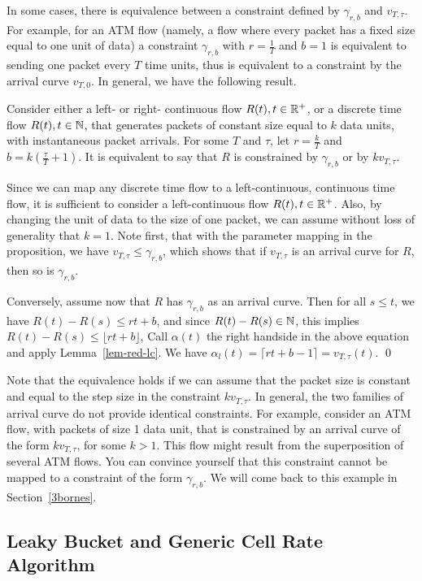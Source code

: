 In some cases, there is equivalence between a constraint defined
by $\gamma_{r,b}$ and $v_{T, \tau}$. For example, for an ATM flow
(namely, a flow where every packet has a fixed size equal to one
unit of data) a constraint $\gamma_{r,b}$ with $r=\frac{1}{T}$ and
$b=1$ is equivalent to sending one packet every $T$ time units,
thus is equivalent to a constraint by the arrival curve $v_{T,
0}$. In general, we have the following result.
\begin{proposition}
Consider either a left- or right- continuous flow $R(t), t \in
\mathbb{R}^+$, or a discrete time flow $R(t), t \in \mathbb{N}$, that
generates packets of constant size equal to $k$ data units, with
instantaneous packet arrivals. For some $T$ and $\tau$, let
$r=\frac{k}{T}$ and $b=k(\frac{\tau}{T}+1)$. It is equivalent to
say that $R$ is constrained by $\gamma_{r,b}$ or by $k v_{T,
\tau}$.
\end{proposition}
\pr Since we can map any discrete time flow to a left-continuous,
continuous time flow, it is sufficient to consider a
left-continuous flow $R(t), t \in \mathbb{R}^+$. Also, by changing the
unit of data to the size of one packet, we can assume without loss
of generality that $k=1$. Note first, that with the parameter
mapping in the proposition, we have $v_{T, \tau} \leq
\gamma_{r,b}$, which shows that if $v_{T, \tau}$ is an arrival
curve for $R$, then so is $\gamma_{r,b}$.

Conversely, assume now that $R$ has $\gamma_{r,b}$ as an arrival
curve. Then for all $s\leq t$, we have
$
R(t)-R(s) \leq rt +b
$,
and since $R(t)- R(s) \in \mathbb{N}$, this implies
$
R(t) -R(s) \leq \lfloor rt + b \rfloor $, Call $\alpha(t)$ the
right handside in the above equation and apply
Lemma~\ref{lem-red-lc}. We have $\alpha_l(t)=\lceil rt + b -1
\rceil = v_{T, \tau}(t)$. \qed

Note that the equivalence holds if we can assume that the packet
size is constant and equal to the step size in the constraint $k
v_{T, \tau}$.  In general, the two families of arrival curve do
not provide identical constraints.  For example, consider an ATM
flow, with packets of size 1 data unit, that is constrained by an
arrival curve of the form $ k v_{T, \tau}$, for some $k > 1$. This
flow might result from the superposition of several ATM flows. You
can convince yourself that this constraint cannot be mapped to a
constraint of the form $\gamma_{r,b}$.  We will come back to this
example in Section~\ref{3bornes}.

\subsection{Leaky Bucket and Generic Cell Rate Algorithm}

